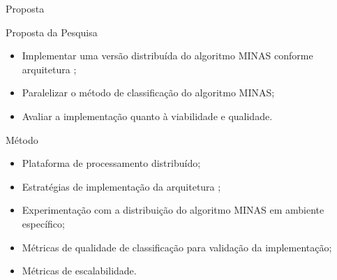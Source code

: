 \documentclass[aspectratio=1610,10pt]{beamer}
\newcommand{\minas}{MINAS\xspace}
\begin{document}
\begin{frame}[fragile]{Proposta}
  \begin{block}{Proposta da Pesquisa}
    \begin{itemize}
      \item Implementar uma versão distribuída do algoritmo \minas conforme arquitetura \arch;
      \item Paralelizar o método de classificação do algoritmo \minas;
      \item Avaliar a implementação quanto à viabilidade e qualidade.
    \end{itemize}
  \end{block}

  \pause
  \begin{alertblock}{Método}
    \begin{itemize}%
      \item Plataforma de processamento distribuído;
      \item Estratégias de implementação da arquitetura \arch;
      \item Experimentação com a distribuição do algoritmo \minas em ambiente específico;
      \item Métricas de qualidade de classificação para validação da implementação;
      \item Métricas de escalabilidade.
    \end{itemize}
  \end{alertblock}
\end{frame}
\end{document}
